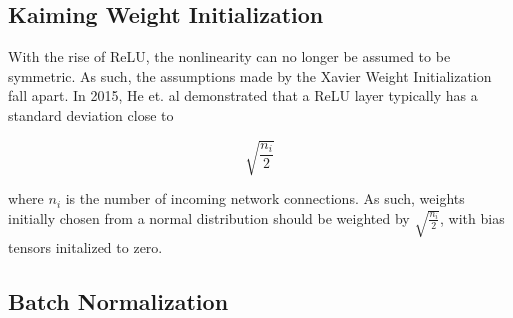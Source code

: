 \subsection*{Kaiming Weight Initialization}
With the rise of ReLU, the nonlinearity can no longer be assumed to be symmetric. As such, the assumptions made by the Xavier Weight Initialization fall apart. In 2015, He et. al demonstrated that a ReLU layer typically has a standard deviation close to

\begin{equation}
	\sqrt{\displaystyle\frac{n_{i}}{2}}
\end{equation}

where $n_i$ is the number of incoming network connections. As such, weights initially chosen from a normal distribution should be weighted by $\sqrt{\frac{n_{i}}{2}}$, with bias tensors initalized to zero.

\subsection*{Batch Normalization}

